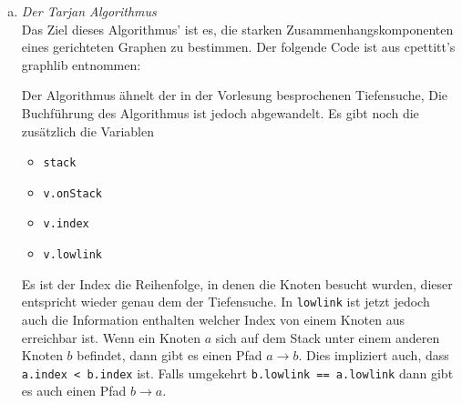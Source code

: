 \documentclass[11pt]{article}
\begin{document}
\begin{enumerate}[a)]
\newpage

      \item \emph{Der Tarjan Algorithmus} \\
        Das Ziel dieses Algorithmus' ist es, die starken Zusammenhangskomponenten
        eines gerichteten Graphen zu bestimmen. Der folgende Code ist aus
        cpettitt's graphlib entnommen:
        

        Der Algorithmus \"ahnelt der in der Vorlesung besprochenen Tiefensuche,
        Die Buchf\"uhrung des Algorithmus ist jedoch abgewandelt. Es gibt noch
        die zus\"atzlich die Variablen
        \begin{itemize}
          \item \texttt{stack}
          \item \texttt{v.onStack}
          \item \texttt{v.index}
          \item \texttt{v.lowlink}
        \end{itemize}
        Es ist der Index die Reihenfolge, in denen die
        Knoten besucht wurden, dieser entspricht wieder genau dem der Tiefensuche.
        In \texttt{lowlink} ist jetzt jedoch auch die Information enthalten
        welcher Index von einem Knoten aus erreichbar ist. Wenn ein Knoten $a$
        sich auf dem Stack unter einem anderen Knoten $b$ befindet, dann gibt
        es einen Pfad $a \to b$. Dies impliziert auch, dass \texttt{a.index <
        b.index} ist.  Falls umgekehrt \texttt{b.lowlink  == a.lowlink} dann
        gibt es auch einen Pfad $b \to a$.


\end{enumerate}
\end{document}
